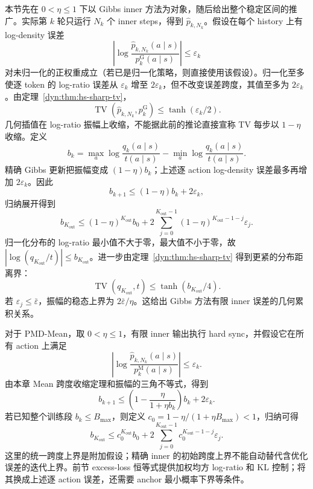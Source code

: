 \documentclass[lang=cn,scheme=chinese,openany]{../book/elegantbook}
\newcommand{\TV}{\operatorname{TV}}
\begin{document}
本节先在 $0<\eta\leq1$ 下以 Gibbs inner 方法为对象，随后给出整个稳定区间的推广。实际第 $k$ 轮只运行 $N_k$ 个 inner steps，得到 $\widehat p_{k,N_k}$。假设在每个 history 上有 log-density 误差
\begin{equation*}
 \left|\log\frac{\widehat p_{k,N_k}(a\mid s)}{p_k^{\mathrm G}(a\mid s)}\right|\leq\varepsilon_k
\end{equation*}
对未归一化的正权重成立（若已是归一化策略，则直接使用该假设）。归一化至多使逐 token 的 log-ratio 误差从 $\varepsilon_k$ 增至 $2\varepsilon_k$，但不改变误差跨度，其值至多为 $2\varepsilon_k$。由定理~\ref{dyn:thm:hs-sharp-tv}，
\begin{equation}\label{dyn:eq:finite-inner-tv}
 \TV(\widehat p_{k,N_k},p_k^{\mathrm G})
 \leq \tanh(\varepsilon_k/2).
\end{equation}
几何插值在 log-ratio 振幅上收缩，不能据此前的推论直接宣称 TV 每步以 $1-\eta$ 收缩。定义
\begin{equation*}
b_k=\max_a\log\frac{q_k(a\mid s)}{t(a\mid s)}
-\min_a\log\frac{q_k(a\mid s)}{t(a\mid s)}.
\end{equation*}
精确 Gibbs 更新把振幅变成 $(1-\eta)b_k$；上述逐 action log-density 误差最多再增加 $2\varepsilon_k$。因此
\begin{equation}\label{dyn:eq:outer-error-recursion}
b_{k+1}\le(1-\eta)b_k+2\varepsilon_k,
\end{equation}
归纳展开得到
\begin{equation*}
b_{K_{\mathrm{out}}}\le(1-\eta)^{K_{\mathrm{out}}} b_0
+2\sum_{j=0}^{K_{\mathrm{out}}-1}(1-\eta)^{K_{\mathrm{out}}-1-j}\varepsilon_j.
\end{equation*}
归一化分布的 log-ratio 最小值不大于零，最大值不小于零，故 $|\log(q_{K_{\mathrm{out}}}/t)|\le b_{K_{\mathrm{out}}}$。进一步由定理~\ref{dyn:thm:hs-sharp-tv} 得到更紧的分布距离界：
\begin{equation*}
\TV(q_{K_{\mathrm{out}}},t)\le\tanh(b_{K_{\mathrm{out}}}/4).
\end{equation*}
若 $\varepsilon_j\le\bar\varepsilon$，振幅的稳态上界为 $2\bar\varepsilon/\eta$。这给出 Gibbs 方法有限 inner 误差的几何累积关系。

对于 PMD-Mean，取 $0<\eta\le1$，有限 inner 输出执行 hard sync，并假设它在所有 action 上满足
\begin{equation*}
\left|\log\frac{\widehat p_{k,N_k}(a\mid s)}
{p_k^{\mathrm M}(a\mid s)}\right|\le\varepsilon_k.
\end{equation*}
由本章 Mean 跨度收缩定理和振幅的三角不等式，得到
\begin{equation*}
b_{k+1}\le\left(1-\frac{\eta}{1+\eta b_k}\right)b_k+2\varepsilon_k.
\end{equation*}
若已知整个训练段 $b_k\le B_{\max}$，则定义
$c_0=1-\eta/(1+\eta B_{\max})<1$，归纳可得
\begin{equation*}
b_{K_{\mathrm{out}}}\le c_0^{K_{\mathrm{out}}}b_0
+2\sum_{j=0}^{K_{\mathrm{out}}-1}c_0^{K_{\mathrm{out}}-1-j}\varepsilon_j.
\end{equation*}
这里的统一跨度上界是附加假设；精确 inner 的初始跨度上界不能自动替代含优化误差的迭代上界。前节 excess-loss 恒等式提供加权均方 log-ratio 和 KL 控制；将其换成上述逐 action 误差，还需要 anchor 最小概率下界等条件。
\end{document}
